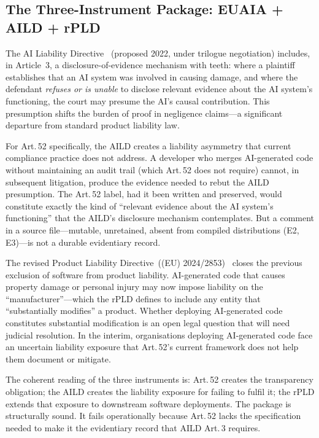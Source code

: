 \documentclass[conference]{IEEEtran}
\begin{document}
\subsection{The Three-Instrument Package: EUAIA + AILD + rPLD}

The AI Liability Directive~\cite{aild2022} (proposed 2022, under
trilogue negotiation) includes, in Article~3, a disclosure-of-evidence
mechanism with teeth: where a plaintiff establishes that an AI system was
involved in causing damage, and where the defendant \emph{refuses or is
unable} to disclose relevant evidence about the AI system's functioning,
the court may presume the AI's causal contribution.  This presumption
shifts the burden of proof in negligence claims---a significant departure
from standard product liability law.

For Art.\,52 specifically, the AILD creates a liability asymmetry that
current compliance practice does not address.  A developer who merges
AI-generated code without maintaining an audit trail (which Art.\,52
does not require) cannot, in subsequent litigation, produce the evidence
needed to rebut the AILD presumption.  The Art.\,52 label, had it been
written and preserved, would constitute exactly the kind of ``relevant
evidence about the AI system's functioning'' that the AILD's disclosure
mechanism contemplates.  But a comment in a source file---mutable,
unretained, absent from compiled distributions (E2, E3)---is not a
durable evidentiary record.

The revised Product Liability Directive~((EU) 2024/2853)~\cite{rpld2024}
closes the previous exclusion of software from product liability.
AI-generated code that causes property damage or personal injury may now
impose liability on the ``manufacturer''---which the rPLD defines to
include any entity that ``substantially modifies'' a product.  Whether
deploying AI-generated code constitutes substantial modification is an
open legal question that will need judicial resolution.  In the interim,
organisations deploying AI-generated code face an uncertain liability
exposure that Art.\,52's current framework does not help them document
or mitigate.

The coherent reading of the three instruments is: Art.\,52 creates the
transparency obligation; the AILD creates the liability exposure for
failing to fulfil it; the rPLD extends that exposure to downstream
software deployments.  The package is structurally sound.  It fails
operationally because Art.\,52 lacks the specification needed to make it
the evidentiary record that AILD Art.\,3 requires.
\end{document}
